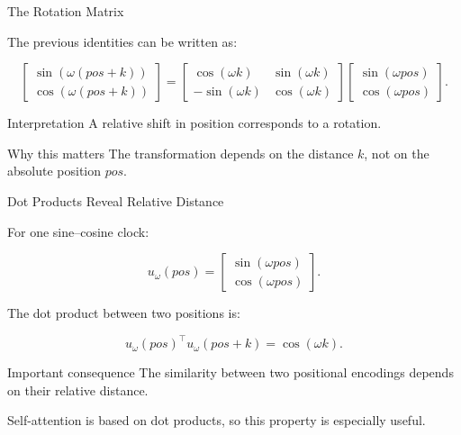 \documentclass[aspectratio=169]{beamer}
\begin{document}
\begin{frame}{The Rotation Matrix}

The previous identities can be written as:

\[
\begin{bmatrix}
\sin(\omega(pos+k)) \\
\cos(\omega(pos+k))
\end{bmatrix}
=
\begin{bmatrix}
\cos(\omega k) & \sin(\omega k) \\
-\sin(\omega k) & \cos(\omega k)
\end{bmatrix}
\begin{bmatrix}
\sin(\omega pos) \\
\cos(\omega pos)
\end{bmatrix}.
\]

\medskip

\begin{block}{Interpretation}
A relative shift in position corresponds to a rotation.
\end{block}

\medskip

\begin{alertblock}{Why this matters}
The transformation depends on the distance \(k\), not on the absolute position \(pos\).
\end{alertblock}

\end{frame}
%
%
\begin{frame}{Dot Products Reveal Relative Distance}

For one sine--cosine clock:

\[
u_\omega(pos)
=
\begin{bmatrix}
\sin(\omega pos) \\
\cos(\omega pos)
\end{bmatrix}.
\]

The dot product between two positions is:

\[
u_\omega(pos)^\top u_\omega(pos+k)
=
\cos(\omega k).
\]

\medskip

\begin{alertblock}{Important consequence}
The similarity between two positional encodings depends on their relative distance.
\end{alertblock}

\medskip

Self-attention is based on dot products, so this property is especially useful.

\end{frame}
%
\end{document}
